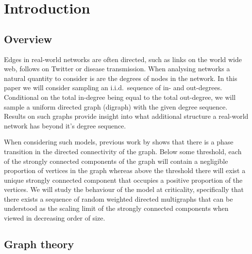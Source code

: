 \section{Introduction}


\subsection{Overview}

Edges in real-world networks are often directed, such as links on the world wide web, follows on Twitter or disease transmission. When analysing networks a natural quantity to consider is are the degrees of nodes in the network.  In this paper we will consider sampling an i.i.d.\ sequence of in- and out-degrees. Conditional on the total in-degree being equal to the total out-degree, we will sample a uniform directed graph (digraph) with the given degree sequence. Results on such graphs provide insight into what additional structure a real-world network has beyond it's degree sequence.

When considering such models, previous work by \citet{cooperSizeLargestStrongly2004} shows that there is a phase transition in the directed connectivity of the graph. Below some threshold, each of the strongly connected components of the graph will contain a negligible proportion of vertices in the graph whereas above the threshold there will exist a unique strongly connected component that occupies a positive proportion of the vertices.  We will study the behaviour of the model at criticality, specifically that there exists a sequence of random weighted directed multigraphs that can be understood as the scaling limit of the strongly connected components when viewed in decreasing order of size.

\subsection{Graph theory}

